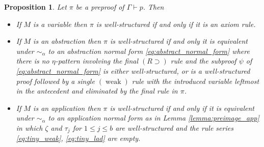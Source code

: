 \documentclass[english,letter paper,12pt,leqno]{article}
\newtheorem{proposition}[theorem]{Proposition}
\theoremstyle{example}
\numberwithin{equation}{section}
\def\imp{\supset}
\begin{document}
\begin{proposition}\label{prop:normal_form} Let $\pi$ be a preproof of $\Gamma \vdash p$. Then
\begin{itemize}
\item[(I)] If $M$ is a variable then $\pi$ is well-structured if and only if it is an axiom rule.
\item[(II)] If $M$ is an abstraction then $\pi$ is well-structured if and only it is equivalent under $\sim_\alpha$ to an abstraction normal form \eqref{eq:abstract_normal_form} where there is no $\eta$-pattern involving the final $(R \imp)$ rule and the subproof $\psi$ of \eqref{eq:abstract_normal_form} is either well-structured, or is a well-structured proof followed by a single $(\operatorname{weak})$ rule with the introduced variable leftmost in the antecedent and eliminated by the final rule in $\pi$.
\item[(III)] If $M$ is an application then $\pi$ is well-structured if and only if it is equivalent under $\sim_\alpha$ to an application normal form as in Lemma \ref{lemma:preimage_app} in which $\zeta$ and $\tau_j$ for $1 \le j \le b$ are well-structured and the rule series \eqref{eq:tiny_weak}, \eqref{eq:tiny_lad} are empty. %
\end{itemize}
\end{proposition}
\end{document}
